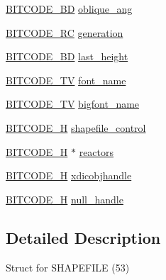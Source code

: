 \begin{DoxyCompactItemize}
\item 
\hyperlink{dwg_8h_a3c1e6781466b74ba07785d57da70ed97}{\-B\-I\-T\-C\-O\-D\-E\-\_\-\-B\-D} \hyperlink{struct__dwg__object__SHAPEFILE_a5000267514e21909c6e978265d8e982f}{oblique\-\_\-ang}
\item 
\hyperlink{dwg_8h_a7fd199a8f9c9cc52bdab220f65a2a619}{\-B\-I\-T\-C\-O\-D\-E\-\_\-\-R\-C} \hyperlink{struct__dwg__object__SHAPEFILE_a6fb4c3abcb4bb99fa43853d0d6f82438}{generation}
\item 
\hyperlink{dwg_8h_a3c1e6781466b74ba07785d57da70ed97}{\-B\-I\-T\-C\-O\-D\-E\-\_\-\-B\-D} \hyperlink{struct__dwg__object__SHAPEFILE_a75022caa6f310e459b45f1bc995d7f0c}{last\-\_\-height}
\item 
\hyperlink{dwg_8h_a2a7e040c6e36ca039b03608679ecaf7c}{\-B\-I\-T\-C\-O\-D\-E\-\_\-\-T\-V} \hyperlink{struct__dwg__object__SHAPEFILE_a03995cf751b09cede31b38ff5e2bf967}{font\-\_\-name}
\item 
\hyperlink{dwg_8h_a2a7e040c6e36ca039b03608679ecaf7c}{\-B\-I\-T\-C\-O\-D\-E\-\_\-\-T\-V} \hyperlink{struct__dwg__object__SHAPEFILE_a07abd193b11cc56d66819eb3ca51463d}{bigfont\-\_\-name}
\item 
\hyperlink{dwg_8h_a7c700e94e047a97ba8c24bdfe4029dc3}{\-B\-I\-T\-C\-O\-D\-E\-\_\-\-H} \hyperlink{struct__dwg__object__SHAPEFILE_a77790b493c0953ff4a9091cf731a2ce1}{shapefile\-\_\-control}
\item 
\hyperlink{dwg_8h_a7c700e94e047a97ba8c24bdfe4029dc3}{\-B\-I\-T\-C\-O\-D\-E\-\_\-\-H} $\ast$ \hyperlink{struct__dwg__object__SHAPEFILE_a6fb99d898a478d44f374921bba385a5b}{reactors}
\item 
\hyperlink{dwg_8h_a7c700e94e047a97ba8c24bdfe4029dc3}{\-B\-I\-T\-C\-O\-D\-E\-\_\-\-H} \hyperlink{struct__dwg__object__SHAPEFILE_a9ddc258164377f0c6343cc409bc4cb16}{xdicobjhandle}
\item 
\hyperlink{dwg_8h_a7c700e94e047a97ba8c24bdfe4029dc3}{\-B\-I\-T\-C\-O\-D\-E\-\_\-\-H} \hyperlink{struct__dwg__object__SHAPEFILE_a81ea9c36532844b56f03d6dc093f25e4}{null\-\_\-handle}
\end{DoxyCompactItemize}


\subsection{\-Detailed \-Description}
\-Struct for \-S\-H\-A\-P\-E\-F\-I\-L\-E (53) 

